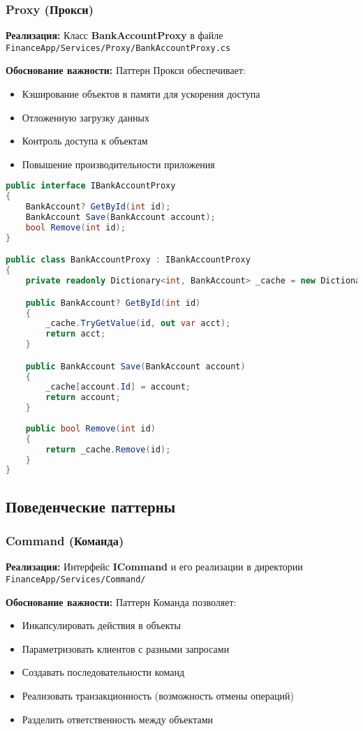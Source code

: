 \documentclass[12pt,a4paper]{article}
\begin{document}
\subsubsection{Proxy (Прокси)}

\textbf{Реализация:} Класс \textbf{BankAccountProxy} в файле \texttt{FinanceApp/Services/Proxy/BankAccountProxy.cs}

\textbf{Обоснование важности:} Паттерн Прокси обеспечивает:
\begin{itemize}
    \item Кэширование объектов в памяти для ускорения доступа
    \item Отложенную загрузку данных
    \item Контроль доступа к объектам
    \item Повышение производительности приложения
\end{itemize}

\begin{lstlisting}[language=csharp]
public interface IBankAccountProxy
{
    BankAccount? GetById(int id);
    BankAccount Save(BankAccount account);
    bool Remove(int id);
}

public class BankAccountProxy : IBankAccountProxy
{
    private readonly Dictionary<int, BankAccount> _cache = new Dictionary<int, BankAccount>();

    public BankAccount? GetById(int id)
    {
        _cache.TryGetValue(id, out var acct);
        return acct;
    }

    public BankAccount Save(BankAccount account)
    {
        _cache[account.Id] = account;
        return account;
    }
    
    public bool Remove(int id)
    {
        return _cache.Remove(id);
    }
}
\end{lstlisting}

\subsection{Поведенческие паттерны}

\subsubsection{Command (Команда)}

\textbf{Реализация:} Интерфейс \textbf{ICommand} и его реализации в директории \texttt{FinanceApp/Services/Command/}

\textbf{Обоснование важности:} Паттерн Команда позволяет:
\begin{itemize}
    \item Инкапсулировать действия в объекты
    \item Параметризовать клиентов с разными запросами
    \item Создавать последовательности команд
    \item Реализовать транзакционность (возможность отмены операций)
    \item Разделить ответственность между объектами
\end{itemize}
\end{document}
